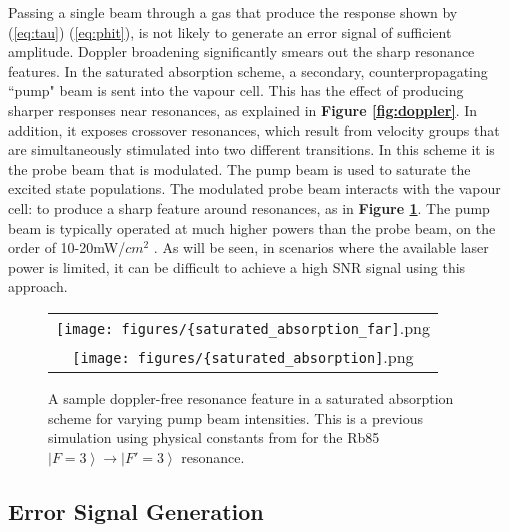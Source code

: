 Passing a single beam through a gas that produce the response shown by (\ref{eq:tau}) (\ref{eq:phit}), is not likely to generate an error signal of sufficient amplitude. Doppler broadening significantly smears out the sharp resonance features. In the saturated absorption scheme, a secondary, counterpropagating ``pump" beam is sent into the vapour cell. This has the effect of producing sharper responses near resonances, as explained in \textbf{Figure \ref{fig:doppler}}. In addition, it exposes crossover resonances, which result from velocity groups that are simultaneously stimulated into two different transitions. In this scheme it is the probe beam that is modulated. The pump beam is used to saturate the excited state populations. The modulated probe beam interacts with the vapour cell:
to produce a sharp feature around resonances, as in \textbf{Figure \ref{fig:sat_abs}}. The pump beam is typically operated at much higher powers than the probe beam, on the order of 10-20mW/$cm^2$ \cite{maguire2006}. As will be seen, in scenarios where the available laser power is limited, it can be difficult to achieve a high SNR signal using this approach.

\begin{figure}
  \centering
  \begin{tabular}{c}
    \texttt{[image: figures/\{saturated\_absorption\_far]}.png}\\
    \texttt{[image: figures/\{saturated\_absorption]}.png}
  \end{tabular}
  \caption[A sample doppler-free resonance feature in a saturated absorption scheme]{A sample doppler-free resonance feature in a saturated absorption scheme for varying pump beam intensities. This is a previous simulation using physical constants from \cite{steckrb85} for the Rb85 $\left|F=3\right\rangle \rightarrow \left|F'=3\right\rangle$ resonance.}
  \label{fig:sat_abs}
\end{figure}



\subsection{Error Signal Generation}

